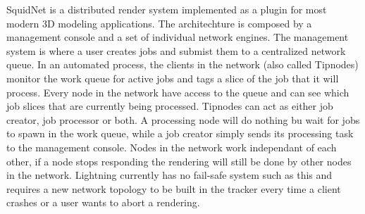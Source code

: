 
SquidNet is a distributed render system implemented as a plugin for most modern 3D modeling applications. The architechture is composed by a management console and a set of individual network engines. The management system is where a user creates jobs and submist them to a centralized network queue. In an automated process, the clients in the network (also called Tipnodes) monitor the work queue for active jobs and tags a slice of the job that it will process. Every node in the network have access to the queue and can see which job slices that are currently being processed. Tipnodes can act as either job creator, job processor or both. A processing node will do nothing bu wait for jobs to spawn in the work queue, while a job creator simply sends its processing task to the management console. Nodes in the network work independant of each other, if a node stops responding the rendering will still be done by other nodes in the network. Lightning currently has no fail-safe system such as this and requires a new network topology to be built in the tracker every time a client crashes or a user wants to abort a rendering. 







